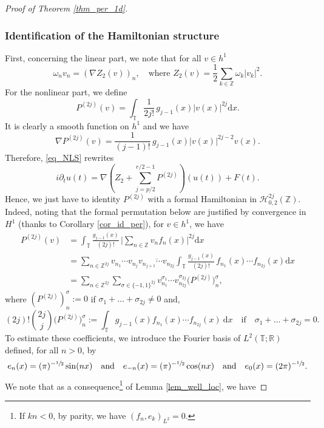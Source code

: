 \documentclass[11pt]{article}
\theoremstyle{definition}
\begin{document}
\begin{proof}[Proof of Theorem \ref{thm_per_1d}]
\subsubsection*{Identification of the Hamiltonian structure}
First, concerning the linear part, we note that for all $v\in h^1$
\[
\omega_n v_n = (\nabla Z_2(v))_n,\quad \text{where } Z_2(v) = \frac12 \sum_{k\in \mathbb{Z}} \omega_k |v_k|^2.
\]
For the nonlinear part, we define
\[
P^{(2j)}(v)= \int_{\mathbb{T}} \frac1{2j!}\, g_{j-1}(x) |v(x)|^{2j} \mathrm{d}x.
\]
It is clearly a smooth function on $h^1$ and we have
\[
\nabla P^{(2j)}(v) = \frac1{(j-1)!}\, g_{j-1}(x) |v(x)|^{2j-2} v(x).
\]
Therefore, \eqref{eq_NLS} rewrites
\begin{equation}
\label{raclette_a_la_chevre}
i\partial_t u(t) = \nabla(Z_2 + \sum_{j=p/2}^{r/2-1} P^{(2j)})(u(t)) + F(t).
\end{equation}
Hence, we just have to identity $P^{(2j)}$ with a formal Hamiltonian in $\mathscr{H}_{0,2}^{2j}(\mathbb{Z})$. Indeed, noting that the formal permutation below are justified by convergence in $H^1$ (thanks to Corollary \ref{cor_id_per}), for $v\in h^1$, we have
\begin{equation*}
\begin{split}
\!\!\!\!\!\! P^{(2j)}(v) &= \int_{\mathbb{T}} \frac{g_{j-1}(x)}{(2j)!}\, \Big| \sum_{n \in \mathbb{Z}} v_n f_n(x) \Big|^{2j} \mathrm{d}x \\
&=\sum_{n \in \mathbb{Z}^{2j}} v_{n_1}\cdots v_{n_{j}} \overline{v_{n_{j+1}} \cdots v_{n_{2j}}} \int_{\mathbb{T}} \frac{g_{j-1}(x)}{(2j)!}\, f_{n_1}(x) \cdots f_{n_{2j}}(x) \mathrm{d}x \\
&= \sum_{n \in \mathbb{Z}^{2j}} \sum_{\sigma \in \{-1,1\}^{2j}} v_{n_1}^{\sigma_1}\cdots v_{n_{2j}}^{\sigma_{2j}} \bigl(P^{(2j)}\bigr)_n^\sigma,
\end{split}
\end{equation*}
where $(P^{(2j)})_n^\sigma:= 0$ if $\sigma_1+\dots+ \sigma_{2j}\neq 0$ and,
\[
(2j)! \binom{2j}{j} \bigl(P^{(2j)}\bigr)_n^\sigma:= \int_{\mathbb{T}} g_{j-1}(x) f_{n_1}(x) \cdots f_{n_{2j}}(x) \ \mathrm{d}x \quad \mathrm{if} \quad \sigma_1+\dots+ \sigma_{2j} = 0.
\]
To estimate these coefficients, we introduce the Fourier basis of $L^2(\mathbb{T};\mathbb{R})$ defined, for all $n>0$, by
\[
e_n(x)=(\pi)^{-\sfrac12}\sin(n x) \quad \text{and}\quad e_{-n}(x)=(\pi)^{-\sfrac12}\cos(n x) \quad \text{and}\quad e_0(x)=(2\pi)^{-\sfrac12}.
\]
We note that as a consequence\footnote{If $kn<0$, by parity, we have $(f_n,e_k)_{L^2}=0$.} of Lemma \ref{lem_well_loc}, we have

\end{proof}
\end{document}
